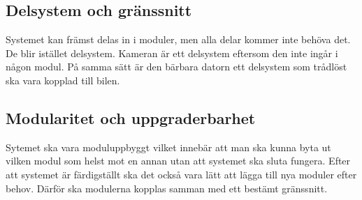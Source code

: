 \documentclass[systemskiss/skiss.tex]{subfiles}
\begin{document}
\subsection{Delsystem och gränssnitt}
Systemet kan främst delas in i moduler, men alla delar kommer inte behöva det. De blir istället delsystem. Kameran är ett delsystem eftersom den inte ingår i någon modul. På samma sätt är den bärbara datorn ett delsystem som trådlöst ska vara kopplad till bilen. 

\subsection{Modularitet och uppgraderbarhet}
Sytemet ska vara moduluppbyggt vilket innebär att man ska kunna byta ut vilken modul som helst mot en annan utan att systemet ska sluta fungera. Efter att systemet är färdigställt ska det också vara lätt att lägga till nya moduler efter behov. Därför ska modulerna kopplas samman med ett bestämt gränssnitt. 
\end{document}
